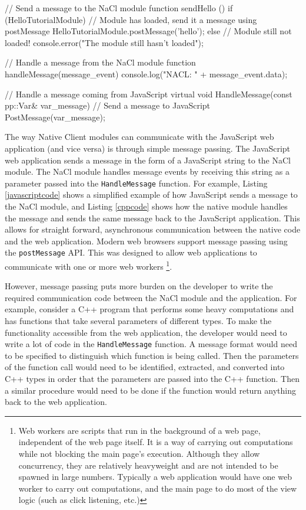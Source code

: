 \begin{code}
// Send a message to the NaCl module
function sendHello () {
  if (HelloTutorialModule) {
    // Module has loaded, send it a message using postMessage
    HelloTutorialModule.postMessage('hello');
  } else {
    // Module still not loaded!
    console.error("The module still hasn't loaded");
  }
}

// Handle a message from the NaCl module
function handleMessage(message_event) {
  console.log("NACL: " + message_event.data);
}
\end{code}


\begin{code}
// Handle a message coming from JavaScript
virtual void HandleMessage(const pp::Var& var_message) {
  // Send a message to JavaScript
  PostMessage(var_message);
}
\end{code}

The way Native Client modules can communicate with the JavaScript web application (and vice versa) is through simple message passing. The JavaScript web application sends a message in the form of a JavaScript string to the NaCl module. The NaCl module handles message events by receiving this string as a parameter passed into the \lstinline+HandleMessage+ function. For example, Listing \ref{javascriptcode} shows a simplified example of how JavaScript sends a message to the NaCl module, and Listing \ref{cppcode} shows how the native module handles the message and sends the same message back to the JavaScript application. This allows for straight forward, asynchronous communication between the native code and the web application. Modern web browsers support message passing using the \lstinline+postMessage+ API. This was designed to allow web applications to communicate with one or more web workers
\footnote{Web workers\cite{webworkersw3c} are scripts that run in the background of a web page, independent of the web page itself. It is a way of carrying out computations while not blocking the main page's execution. Although they allow concurrency, they are relatively heavyweight and are not intended to be spawned in large numbers. Typically a web application would have one web worker to carry out computations, and the main page to do most of the view logic (such as click listening, etc.)}. 

However, message passing puts more burden on the developer to write the required communication code between the NaCl module and the application. For example, consider a C++ program that performs some heavy computations and has functions that take several parameters of different types. To make the functionality accessible from the web application, the developer would need to write a lot of code in the \lstinline+HandleMessage+ function. A message format would need to be specified to distinguish which function is being called. Then the parameters of the function call would need to be identified, extracted, and converted into C++ types in order that the parameters are passed into the C++ function. Then a similar procedure would need to be done if the function would return anything back to the web application. 

